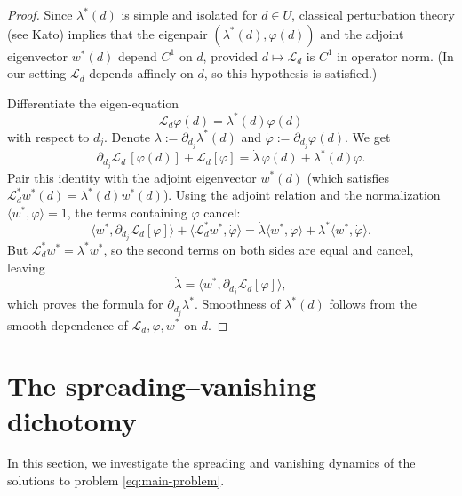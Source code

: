 \documentclass[a4paper,11pt]{amsart}
\theoremstyle{definition}
\numberwithin{equation}{section}
\theoremstyle{definition}
\begin{document}
\begin{proof}
Since \(\lambda^\ast(d)\) is simple and isolated for \(d\in U\), classical perturbation theory (see Kato) implies that the eigenpair \((\lambda^\ast(d),\varphi(d))\) and the adjoint eigenvector \(w^*(d)\) depend \(C^1\) on \(d\), provided \(d\mapsto\mathcal L_d\) is \(C^1\) in operator norm. (In our setting \(\mathcal L_d\) depends affinely on \(d\), so this hypothesis is satisfied.)

Differentiate the eigen-equation
\[
\mathcal L_d\varphi(d)=\lambda^\ast(d)\varphi(d)
\]
with respect to \(d_j\). Denote \(\dot\lambda:=\partial_{d_j}\lambda^\ast(d)\) and \(\dot\varphi:=\partial_{d_j}\varphi(d)\). We get
\[
\partial_{d_j}\mathcal L_d\,[\varphi(d)] + \mathcal L_d[\dot\varphi] = \dot\lambda\,\varphi(d) + \lambda^\ast(d)\dot\varphi.
\]
Pair this identity with the adjoint eigenvector \(w^*(d)\) (which satisfies \(\mathcal L_d^* w^*(d)=\lambda^\ast(d) w^*(d)\)). Using the adjoint relation and the normalization \(\langle w^*,\varphi\rangle=1\), the terms containing \(\dot\varphi\) cancel:
\[
\langle w^*,\partial_{d_j}\mathcal L_d[\varphi]\rangle
+ \langle \mathcal L_d^* w^*,\dot\varphi\rangle
= \dot\lambda\langle w^*,\varphi\rangle + \lambda^\ast\langle w^*,\dot\varphi\rangle.
\]
But \(\mathcal L_d^* w^* = \lambda^\ast w^*\), so the second terms on both sides are equal and cancel, leaving
\[
\dot\lambda = \langle w^*,\partial_{d_j}\mathcal L_d[\varphi]\rangle,
\]
which proves the formula for \(\partial_{d_j}\lambda^\ast\). Smoothness of \(\lambda^\ast(d)\) follows from the smooth dependence of \(\mathcal L_d,\varphi,w^*\) on \(d\).
\end{proof}




\section{The spreading–vanishing dichotomy }

In this section, we investigate the spreading and vanishing dynamics of the solutions to problem \eqref{eq:main-problem}.
\end{document}
